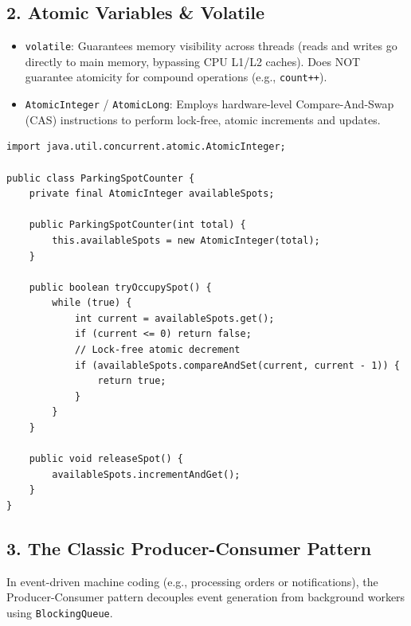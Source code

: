 \documentclass[10pt,journal,compsoc,onecolumn]{IEEEtran}
\begin{document}
\subsection{2. Atomic Variables \& Volatile}
\begin{itemize}
    \item \texttt{volatile}: Guarantees memory visibility across threads (reads and writes go directly to main memory, bypassing CPU L1/L2 caches). Does NOT guarantee atomicity for compound operations (e.g., \texttt{count++}).
    \item \texttt{AtomicInteger} / \texttt{AtomicLong}: Employs hardware-level Compare-And-Swap (CAS) instructions to perform lock-free, atomic increments and updates.
\end{itemize}

\begin{verbatim}
import java.util.concurrent.atomic.AtomicInteger;

public class ParkingSpotCounter {
    private final AtomicInteger availableSpots;

    public ParkingSpotCounter(int total) {
        this.availableSpots = new AtomicInteger(total);
    }

    public boolean tryOccupySpot() {
        while (true) {
            int current = availableSpots.get();
            if (current <= 0) return false;
            // Lock-free atomic decrement
            if (availableSpots.compareAndSet(current, current - 1)) {
                return true;
            }
        }
    }

    public void releaseSpot() {
        availableSpots.incrementAndGet();
    }
}
\end{verbatim}

\subsection{3. The Classic Producer-Consumer Pattern}
In event-driven machine coding (e.g., processing orders or notifications), the Producer-Consumer pattern decouples event generation from background workers using \texttt{BlockingQueue}.
\end{document}
